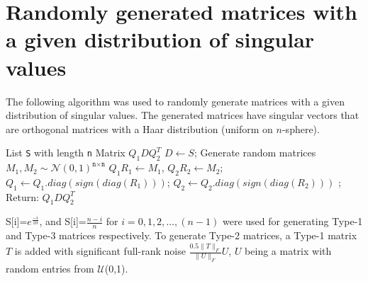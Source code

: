 \documentclass[onefignum,onetabnum]{siamart171218}
\begin{document}
\section{Randomly generated matrices with a given distribution of singular values} \label{sec:matrix_generation}
The following algorithm was used to randomly generate matrices with a given distribution of singular values. The generated matrices have singular vectors that are  orthogonal matrices with a Haar distribution (uniform on $n$-sphere).

\begin{algorithm}[H]
\caption{Generate Matrices with Specific Singular Value Distributions} 
\begin{algorithmic}[1]
\Require List \texttt{S} with length \texttt{n}
\Ensure Matrix $Q_1 D Q_2^T$
\State $D \longleftarrow S$; 
\State Generate random matrices $M_1,M_2 \sim \mathcal{N}(0,1)^{\texttt{n} \times \texttt{n}}$
\State $Q_1 R_1 \longleftarrow M_1$, $Q_2R_2 \longleftarrow M_2$; 
\State $Q_1 \longleftarrow Q_1.diag(sign(diag(R_1)))$; 
\State $Q_2 \longleftarrow Q_2.diag(sign(diag(R_2)))$ ; 
\State Return: $Q_1 D Q_2^T$
\end{algorithmic}
\end{algorithm}

S[i]=$e^{\frac{-i}{10}}$, and S[i]=$\frac{n-i}{n}$ for $i=0,1,2,\dots,(n-1)$ were used for generating Type-1 and Type-3 matrices respectively. To generate Type-2 matrices, a Type-1 matrix $T$ is added with significant full-rank noise $\frac{0.5\|T\|_F}{\|U\|_F}U$, $U$ being a matrix with random entries from $\mathcal{U}$(0,1).
\end{document}
